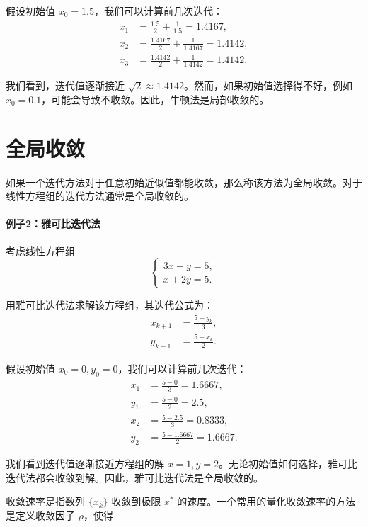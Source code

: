 假设初始值 $x_0 = 1.5$，我们可以计算前几次迭代：
\[
\begin{aligned}
x_1 &= \frac{1.5}{2} + \frac{1}{1.5} = 1.4167, \\
x_2 &= \frac{1.4167}{2} + \frac{1}{1.4167} = 1.4142, \\
x_3 &= \frac{1.4142}{2} + \frac{1}{1.4142} = 1.4142.
\end{aligned}
\]

我们看到，迭代值逐渐接近 $\sqrt{2} \approx 1.4142$。然而，如果初始值选择得不好，例如 $x_0 = 0.1$，可能会导致不收敛。因此，牛顿法是局部收敛的。

\section*{全局收敛}

如果一个迭代方法对于任意初始近似值都能收敛，那么称该方法为全局收敛。对于线性方程组的迭代方法通常是全局收敛的。

\paragraph{例子2：雅可比迭代法}
考虑线性方程组
\[
\begin{cases}
3x + y = 5, \\
x + 2y = 5.
\end{cases}
\]

用雅可比迭代法求解该方程组，其迭代公式为：
\[
\begin{aligned}
x_{k+1} &= \frac{5 - y_k}{3}, \\
y_{k+1} &= \frac{5 - x_k}{2}.
\end{aligned}
\]

假设初始值 $x_0 = 0, y_0 = 0$，我们可以计算前几次迭代：
\[
\begin{aligned}
x_1 &= \frac{5 - 0}{3} = 1.6667, \\
y_1 &= \frac{5 - 0}{2} = 2.5, \\
x_2 &= \frac{5 - 2.5}{3} = 0.8333, \\
y_2 &= \frac{5 - 1.6667}{2} = 1.6667.
\end{aligned}
\]

我们看到迭代值逐渐接近方程组的解 $x = 1, y = 2$。无论初始值如何选择，雅可比迭代法都会收敛到解。因此，雅可比迭代法是全局收敛的。





收敛速率是指数列 $\{x_k\}$ 收敛到极限 $x^*$ 的速度。一个常用的量化收敛速率的方法是定义收敛因子 $\rho$，使得

